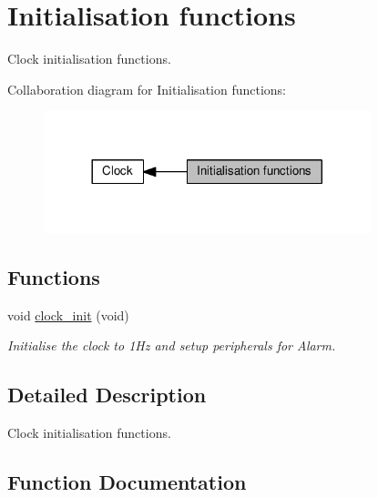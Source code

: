 \hypertarget{group___clock___init}{}\section{Initialisation functions}
\label{group___clock___init}


Clock initialisation functions.  


Collaboration diagram for Initialisation functions\+:\nopagebreak
\begin{figure}[H]
\begin{center}
\leavevmode
\includegraphics[width=269pt]{dd/d06/group___clock___init}
\end{center}
\end{figure}
\subsection*{Functions}
\begin{DoxyCompactItemize}
\item 
void \hyperlink{group___clock___init_ga78ab77b57cf2e00089f0a3a22508524c}{clock\+\_\+init} (void)
\begin{DoxyCompactList}\small\item\em Initialise the clock to 1\+Hz and setup peripherals for Alarm. \end{DoxyCompactList}\end{DoxyCompactItemize}


\subsection{Detailed Description}
Clock initialisation functions. 



\subsection{Function Documentation}
